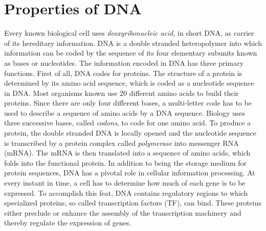 \chapter{\label{sec:general_intro}Properties of DNA}

Every known biological cell uses \emph{deoxyribonucleic acid}, in short DNA, 
%
as carrier of its hereditary information. DNA is a double stranded heteropolymer into which 
information can be coded by the sequence of its four elementary subunits
known as bases or nucleotides. The information encoded in DNA has
three primary functions. First of all, DNA codes for proteins. The structure of a
protein is determined by its amino acid sequence, which
 is coded as a nucleotide sequence in DNA.
Most organisms known use 20 different amino acids to build their proteins. 
Since there are only four different bases, a multi-letter code has to be used to describe
a sequence of amino acids by a DNA sequence. Biology uses three successive bases,
called \emph{codons},
%
to code for one amino acid. To produce a protein, 
the double stranded DNA is locally opened and the nucleotide sequence is transcribed by a protein 
complex called \emph{polymerase} %
into messenger RNA (mRNA). The mRNA is then translated into a sequence of amino acids, which folds into the functional protein.  
%
In addition to being the storage medium for protein sequences, DNA has a pivotal role in 
cellular information processing. At every instant in time, a cell has to determine how much of each gene 
is to be expressed. To accomplish this feat, DNA contains 
regulatory regions to which specialized proteins, so called transcription 
factors (TF), can bind. These proteins either preclude or
%
enhance the assembly of the transcription machinery and thereby regulate the expression of genes. 
